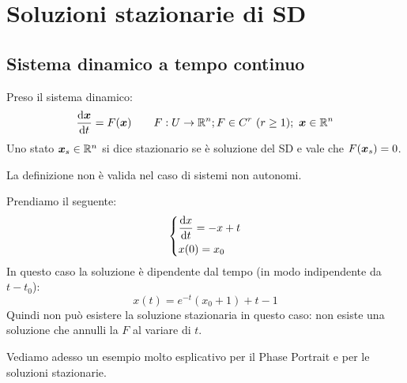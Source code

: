 \section{Soluzioni stazionarie di SD}%
\label{sub:Sistema dinamico a tempo continuo}
\subsection{Sistema dinamico a tempo continuo}%
\label{sub:Soluzioni stazionarie di SD a tempo continuo}
\begin{defn}
    Preso il sistema dinamico:
    \[
	\frac{\text{d} \vect{x}}{\text{d} t} = F(\vect{x}) \qquad F: U\to \mathbb{R}^n;  F \in C^r \ (r\ge 1); \ \vect{x}\in\mathbb{R}^n 
    \] 
    Uno stato $\boldsymbol{x}_s \in \mathbb{R}^n$ si dice stazionario se è soluzione del SD e vale che $F(\boldsymbol{x}_s) = 0$.
\end{defn}
\noindent
La definizione non è valida nel caso di sistemi non autonomi.
\begin{exmp}
    Prendiamo il seguente:
    \[\begin{dcases}
        \frac{\text{d} x}{\text{d} t} = - x + t\\
	x(0)=x_0
    \end{dcases}\] 
    In questo caso la soluzione è dipendente dal tempo (in modo indipendente da $t-t_0$):
    \[
	x(t)= e^{-t}(x_0+1)+t-1
    \] 
    Quindi non può esistere la soluzione stazionaria in questo caso: non esiste una soluzione che annulli la $F$ al variare di $t$.
\end{exmp}
\noindent
Vediamo adesso un esempio molto esplicativo per il Phase Portrait e per le soluzioni stazionarie.
